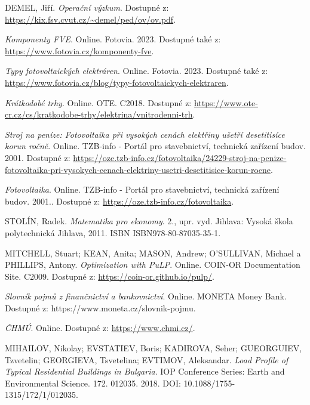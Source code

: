 \begin{thebibliography}{9}
    DEMEL, Jiří. \textit{Operační výzkum}. Dostupné z: \url{https://kix.fsv.cvut.cz/~demel/ped/ov/ov.pdf}.
    
    \textit{Komponenty FVE}. Online. Fotovia. 2023. Dostupné také z: \url{https://www.fotovia.cz/komponenty-fve}.
    
    \textit{Typy fotovoltaických elektráren}. Online. Fotovia. 2023. Dostupné také z: \url{https://www.fotovia.cz/blog/typy-fotovoltaickych-elektraren}.
    
    \textit{Krátkodobé trhy}. Online. OTE. C2018. Dostupné z: \url{https://www.ote-cr.cz/cs/kratkodobe-trhy/elektrina/vnitrodenni-trh}.
    
    \textit{Stroj na peníze: Fotovoltaika při vysokých cenách elektřiny ušetří desetitisíce korun ročně}. Online. TZB-info - Portál pro stavebnictví, technická zařízení budov. 2001. Dostupné z: \url{https://oze.tzb-info.cz/fotovoltaika/24229-stroj-na-penize-fotovoltaika-pri-vysokych-cenach-elektriny-usetri-desetitisice-korun-rocne}.

    \textit{Fotovoltaika}. Online. TZB-info - Portál pro stavebnictví, technická zařízení budov. 2001.. Dostupné z: \url{https://oze.tzb-info.cz/fotovoltaika}.

    STOLÍN, Radek. \textit{Matematika pro ekonomy}. 2., upr. vyd. Jihlava: Vysoká škola polytechnická Jihlava, 2011. ISBN ISBN978-80-87035-35-1.

    MITCHELL, Stuart; KEAN, Anita; MASON, Andrew; O'SULLIVAN, Michael a PHILLIPS, Antony. \textit{Optimization with PuLP}. Online. COIN-OR Documentation Site. C2009. Dostupné z: \url{https://coin-or.github.io/pulp/}.
    
    \textit{Slovník pojmů z finančnictví a bankovnictví}. Online. MONETA Money Bank. Dostupné z: https://www.moneta.cz/slovnik-pojmu.

    \textit{ČHMÚ}. Online. Dostupné z: \url{https://www.chmi.cz/}.

    MIHAILOV, Nikolay; EVSTATIEV, Boris; KADIROVA, Seher; GUEORGUIEV, Tzvetelin; GEORGIEVA, Tsvetelina; EVTIMOV, Aleksandar. \textit{Load Profile of Typical Residential Buildings in Bulgaria}. IOP Conference Series: Earth and Environmental Science. 172. 012035. 2018. DOI: 10.1088/1755-1315/172/1/012035.

\end{thebibliography}